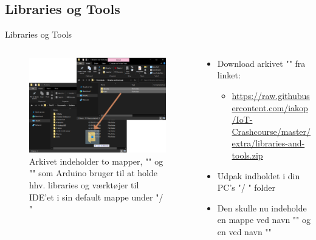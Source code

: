 \documentclass[aspectratio=169]{beamer}
\begin{document}
\subsection{Libraries og Tools}
\begin{frame}{Libraries og Tools}
\begin{columns}
	\begin{column}{0.5\textwidth}
		\begin{figure}
  			\includegraphics[width=\textwidth]{assets/pictures/extract-to-arduino.png}
  			\caption{Arkivet indeholder to mapper, "" og "" som Arduino bruger til at holde hhv. libraries og værktøjer til IDE'et i sin default mappe under "/ "}
  			\label{fig:libraries-and-tools}
		\end{figure}
	\end{column}
	\begin{column}{0.5\textwidth}
		\begin{textBox}
			\begin{itemize}
				\item Download arkivet "" fra linket:
				\begin{itemize}
					\item \tiny\url{https://raw.githubusercontent.com/iakop/IoT-Crashcourse/master/extra/libraries-and-tools.zip}
				\end{itemize}
				\item Udpak indholdet i din PC's "/ " folder
				\item Den skulle nu indeholde en mappe ved navn "" og en ved navn ""
			\end{itemize}
		\end{textBox}
	\end{column}
\end{columns}
\end{frame}
\end{document}
